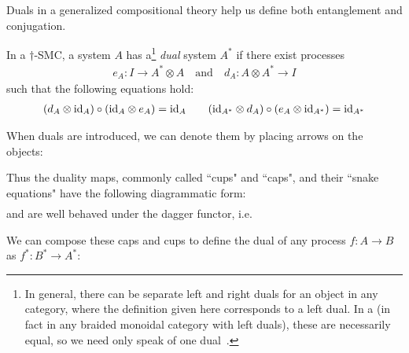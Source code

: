Duals in a generalized compositional theory help us define both entanglement and conjugation.

\begin{defn}
\label{def:dual}
In a $\dagger$-SMC, a system $A$ has a\footnote{In general, there can be separate left and right duals for an object in any category, where the definition given here corresponds to a left dual. In a \dsmc(in fact in any braided monoidal category with left duals), these are necessarily equal, so we need only speak of one dual~\cite[Prop.~7.2]{joyal1993braided}. } \emph{dual} system $A^*$ if there exist processes 
\begin{align}
e_A:I\to A^*\otimes A \quad \mbox{and}\quad d_A:A\otimes A^*\to I
\end{align}
such that the following equations hold:
\begin{align}
(d_A\otimes \mbox{id}_{A})\circ(\mbox{id}_{A}\otimes e_A) = \mbox{id}_{A} \qquad (\mbox{id}_{A^*}\otimes d_A)\circ(e_A\otimes \mbox{id}_{A^*})=\mbox{id}_{A^*}
\end{align}
\end{defn}

When duals are introduced, we can denote them by placing arrows on the objects:
\begin{equation}

\end{equation}

Thus the duality maps, commonly called ``cups" and ``caps", and their ``snake equations" have the following diagrammatic form:
\begin{align}

\end{align}
\begin{equation}
\label{eq:snake}

\end{equation} 
\noindent and are well behaved under the dagger functor, i.e.
\begin{equation}

\end{equation}

We can compose these caps and cups to define the dual of any process $f:A\to B$ as $f^*:B^*\to A^*$:
\begin{equation}
\label{eq:dualmorph}

\end{equation}

